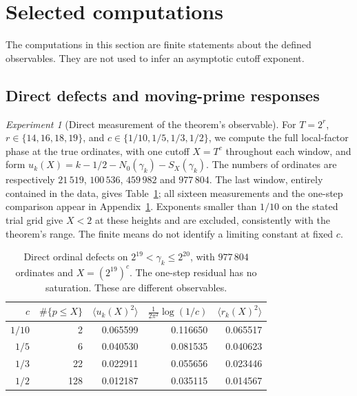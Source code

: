 \documentclass[11pt,reqno]{amsart}
\theoremstyle{plain}\newtheorem{theorem}{Theorem}[section]\newtheorem{proposition}[theorem]{Proposition}\newtheorem{lemma}[theorem]{Lemma}\newtheorem{corollary}[theorem]{Corollary}
\theoremstyle{definition}\newtheorem{hypothesis}[theorem]{Hypothesis}\newtheorem{definition}[theorem]{Definition}
\theoremstyle{remark}\newtheorem{remark}[theorem]{Remark}\newtheorem{experiment}[theorem]{Experiment}\newtheorem{question}[theorem]{Question}\newtheorem{heuristic}[theorem]{Heuristic}\newtheorem{conjecture}[theorem]{Conjecture}
\newcommand{\NO}{N_0}\newcommand{\lL}{\mathcal L}\newcommand{\IT}{\mathcal I_T}\newcommand{\R}{\mathbb R}\newcommand{\N}{\mathbb N}\newcommand{\eps}{\varepsilon}\newcommand{\sgn}{\operatorname{sgn}}
\begin{document}
\section{Selected computations}\label{sec:selected_computations}
The computations in this section are finite statements about the defined observables.  They are not used to infer an asymptotic cutoff exponent.\subsection{Direct defects and moving-prime responses}
\label{subsec:direct_extensions}
\begin{experiment}[Direct measurement of the theorem's observable]\label{exp:direct_defects}
For $T=2^r$, $r\in\{14,16,18,19\}$, and $c\in\{1/10,1/5,1/3,1/2\}$, we compute the full local-factor phase at the true ordinates, with one cutoff $X=T^c$ throughout each window, and form $u_k(X)=k-1/2-\NO(\gamma_k)-S_X(\gamma_k)$. The numbers of ordinates are respectively $21\,519$, $100\,536$, $459\,982$ and $977\,804$. The last window, entirely contained in the data, gives Table~\ref{tab:direct_top}; all sixteen measurements and the one-step comparison appear in Appendix~\ref{sec:selected_computations}. Exponents smaller than $1/10$ on the stated trial grid give $X<2$ at these heights and are excluded, consistently with the theorem's range. The finite means do not identify a limiting constant at fixed $c$.
\end{experiment}
\begin{table}[htbp]
\centering\small
\begin{tabular}{rrrrr}
\toprule
$c$ & $\#\{p\le X\}$ & $\langle u_k(X)^2\rangle$ & $\frac1{2\pi^2}\log(1/c)$ & $\langle r_k(X)^2\rangle$\\
\midrule
$1/10$ & 2 & 0.065599 & 0.116650 & 0.065517\\
$1/5$ & 6 & 0.040530 & 0.081535 & 0.040623\\
$1/3$ & 22 & 0.022911 & 0.055656 & 0.023446\\
$1/2$ & 128 & 0.012187 & 0.035115 & 0.014567\\
\bottomrule
\end{tabular}
\caption{Direct ordinal defects on $2^{19}<\gamma_k\le2^{20}$, with $977\,804$ ordinates and $X=(2^{19})^c$. The one-step residual has no saturation. These are different observables.}
\label{tab:direct_top}
\end{table}
\end{document}
